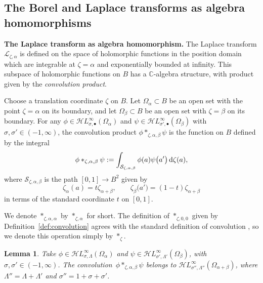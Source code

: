 \documentclass[pdftex]{sigma}
\newcommand{\singexp}[2]{\mathcal{H}L^\infty_{#1, #2}}
\newcommand{\singexpalg}[1]{\singexp{#1}{\bullet}}
\newcommand{\C}{\mathbb{C}}
\newcommand{\laplace}{\mathcal{L}}
\numberwithin{equation}{section}
\newtheorem{Lemma}[Theorem]{Lemma}
\begin{document}
\subsection{The Borel and Laplace transforms as algebra homomorphisms}\label{sec:borel-laplace-homom}
%
{\bf The Laplace transform as algebra homomorphism.}
The Laplace transform $\laplace_{\zeta,\alpha}$ is defined on the space of holomorphic functions in the position domain which are integrable at $\zeta=\alpha$ and exponentially bounded at infinity. This subspace of holomorphic functions on $B$ has a $\C$-algebra structure, with product given by the \textit{convolution product}.
\begin{Definition}\label{def:convolution}
Choose a translation coordinate $\zeta$ on $B$. Let $\Omega_\alpha \subset B$ be an open set with the point $\zeta = \alpha$ on its boundary, and let $\Omega_\beta \subset B$ be an open set with $\zeta = \beta$ on its boundary. For any $\phi \in \singexpalg{\sigma}(\Omega_\alpha)$ and $\psi \in \singexpalg{\sigma'}(\Omega_\beta)$ with $\sigma,\sigma'\in (-1,\infty)$, the convolution product $\phi \ast_{\zeta, \alpha, \beta} \psi$ is the function on $B$ defined by the integral
\[
\phi \ast_{\zeta, \alpha, \beta} \psi := \int_{\mathcal{S}_{\zeta, \alpha, \beta}} \phi(a) \psi\bigl(a'\bigr)\, {\rm d}\zeta(a),
\]
where $\mathcal{S}_{\zeta, \alpha, \beta}$ is the path $[0, 1] \to B^2$ given by
\[
\zeta_\alpha(a) = t\zeta_{\alpha+\beta}, \qquad
\zeta_\beta\bigl(a'\bigr) = (1-t)\zeta_{\alpha+\beta}
\]
in terms of the standard coordinate $t$ on $[0, 1]$.
\end{Definition}
\begin{notation*}
We denote $\ast_{\zeta,\alpha,\alpha}$ by $\ast_{\zeta,\alpha}$ for short. The definition of $\ast_{\zeta, 0, 0}$ given by Definition~\ref{def:convolution} agrees with the standard definition of convolution \cite[Definition~5.12]{diverg-resurg-i}, so we denote this operation simply by $\ast_\zeta$.
\end{notation*}
\begin{Lemma}
Take $\phi\in\singexp{\sigma}{\Lambda}(\Omega_\alpha)$ and $\psi\in\singexp{\sigma'}{\Lambda'}(\Omega_\beta)$, with $\sigma,\sigma'\in (-1,\infty)$. The convolution~$\phi\ast_{\zeta,\alpha,\beta}\psi$ belongs to $\singexp{\sigma''}{\Lambda''}(\Omega_{\alpha+\beta})$, where $\Lambda'' = \Lambda + \Lambda'$ and $\sigma'' = 1+\sigma+\sigma'$.
\end{Lemma}
\end{document}
